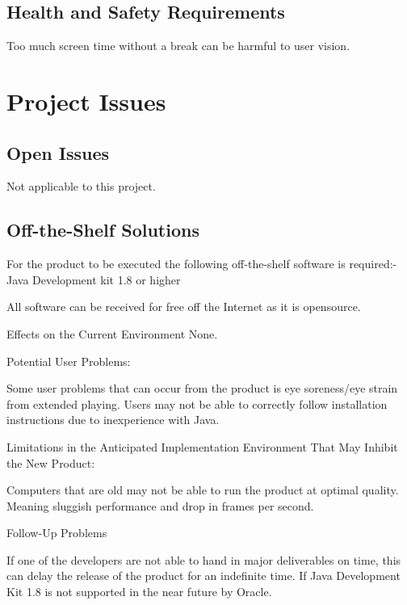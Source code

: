 \documentclass[12pt, titlepage]{article}
\begin{document}
\subsection{Health and Safety Requirements}
Too much screen time without a break can be harmful to user vision. 

\section{Project Issues}
\subsection{Open Issues}
Not applicable to this project.

\subsection{Off-the-Shelf Solutions}
For the product to be executed the following off-the-shelf software is
required:-Java Development kit 1.8 or higher

All software can be received for free off the Internet as it is opensource.

Effects on the Current Environment 
None.

Potential User Problems:

Some user problems that can occur from the product is eye soreness/eye strain
from extended playing. Users may not be able to correctly follow installation
instructions due to inexperience with Java.

Limitations in the Anticipated Implementation Environment That May Inhibit the
New Product:

Computers that are old may not be able to run the product at optimal quality.
Meaning sluggish performance and drop in frames per second.

Follow-Up Problems 

If one of the developers are not able to hand in major deliverables on time,
this can delay the release of the product for an indefinite time. If Java
Development Kit 1.8 is not supported in the near future by Oracle.
\end{document}
